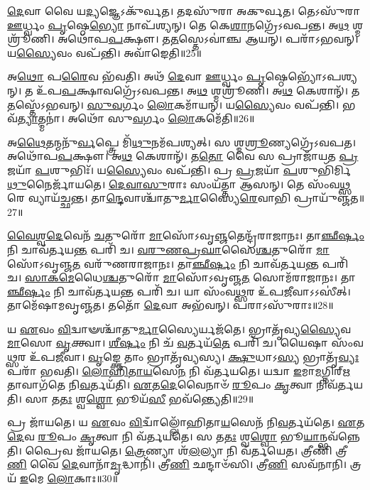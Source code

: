 \-\ul{𑌦𑍇}\-𑌵𑌾 𑌵𑍈 𑌯\-\ul{𑌦𑍍𑌯}\-𑌜𑍍𑌞𑍇\-𑌽𑌕𑍁᳴𑌰𑍍𑌵𑌤।
𑌤𑌦𑌸𑍁᳴𑌰𑌾 𑌅𑌕𑍁𑌰𑍍𑌵𑌤।
𑌤𑍇𑌽𑌸𑍁᳴𑌰𑌾 \ul{𑌊}\-𑌰𑍍𑌧𑍍𑌵𑌂 \ul{𑌪𑍃}\-𑌷𑍍𑌠𑍇\-\ul{𑌭𑍍𑌯𑍋} 𑌨𑌾𑌪᳴𑌶𑍍𑌯𑌨𑍍।
𑌤𑍇 𑌕𑍇\-\ul{𑌶𑌾}\-𑌨𑌗𑍍𑌰𑍇᳴\-𑌽𑌵𑌪𑌨𑍍𑌤।
𑌅\-\ul{𑌥} 𑌶𑍍𑌮𑌶𑍍𑌰𑍂᳴𑌣𑌿।
𑌅𑌥𑍋᳴𑌪\-\ul{𑌪}\-𑌕𑍍𑌷𑍗।
𑌤\-\ul{𑌤}\-𑌸𑍍𑌤𑍇\-𑌽𑌵𑌾॑𑌞𑍍𑌚 𑌆𑌯𑌨𑍍।
𑌪𑌰𑌾᳴𑌽𑌭𑌵𑌨𑍍।
𑌯\-\ul{𑌸𑍍𑌯𑍈}\-𑌵𑌂 𑌵𑌪᳴𑌨𑍍𑌤𑌿।
𑌅𑌵𑌾᳴𑌙𑍇𑌤𑌿॥25॥

𑌅\-\ul{𑌥𑍋} 𑌪\-\ul{𑌰𑍈}\-𑌵 𑌭᳴𑌵𑌤𑌿।
𑌅𑌥᳴ \ul{𑌦𑍇}\-𑌵𑌾 \ul{𑌊}\-𑌰𑍍𑌧𑍍𑌵𑌂 \ul{𑌪𑍃}\-𑌷𑍍𑌠𑍇𑌭𑍍𑌯𑍋᳴\-𑌽𑌪𑌶𑍍𑌯𑌨𑍍।
𑌤 𑌉᳴𑌪\-\ul{𑌪}\-𑌕𑍍𑌷𑌾𑌵𑌗𑍍𑌰𑍇᳴\-𑌽𑌵𑌪𑌨𑍍𑌤।
𑌅\-\ul{𑌥} 𑌶𑍍𑌮𑌶𑍍𑌰𑍂᳴𑌣𑌿।
𑌅\-\ul{𑌥} 𑌕𑍇𑌶𑌾𑌨𑍍᳴।
𑌤\-\ul{𑌤}\-𑌸𑍍𑌤𑍇᳴\-𑌽𑌭𑌵𑌨𑍍।
\-\ul{𑌸𑍁}\-\-\ul{𑌵}\-𑌰𑍍𑌗𑌂 \ul{𑌲𑍋}\-𑌕𑌮𑌾᳴𑌯𑌨𑍍।
𑌯\-\ul{𑌸𑍍𑌯𑍈}\-𑌵𑌂 𑌵𑌪᳴𑌨𑍍𑌤𑌿।
𑌭𑌵᳴\-\ul{𑌤𑍍𑌯𑌾}\-𑌤𑍍𑌮𑌨𑌾॑।
𑌅𑌥𑍋᳴ 𑌸𑍁\-\ul{𑌵}\-𑌰𑍍𑌗𑌂 \ul{𑌲𑍋}\-𑌕𑌮𑍇᳴𑌤𑌿॥26॥

𑌅\-\ul{𑌥𑍈}\-𑌤𑌨𑍍𑌮𑌨𑍁᳴\-\ul{𑌰𑍍𑌵}\-𑌪𑍍𑌤𑍍𑌰𑍇 𑌮𑌿᳴\-\ul{𑌥𑍁}\-𑌨𑌮᳴𑌪𑌶𑍍𑌯𑌤𑍍।
𑌸 𑌶𑍍𑌮\-\ul{𑌶𑍍𑌰𑍂}\-𑌣𑍍𑌯𑌗𑍍𑌰𑍇᳴𑌽𑌵𑌪𑌤।
𑌅𑌥𑍋᳴𑌪\-\ul{𑌪}\-𑌕𑍍𑌷𑍗।
𑌅\-\ul{𑌥} 𑌕𑍇𑌶𑌾𑌨𑍍᳴।
𑌤\-\ul{𑌤𑍋} 𑌵𑍈 𑌸 𑌪𑍍𑌰𑌾𑌜𑌾᳴𑌯𑌤 \ul{𑌪𑍍𑌰}\-𑌜𑌯𑌾᳴ \ul{𑌪}\-𑌶𑍁𑌭𑌿𑌃᳴।
𑌯\-\ul{𑌸𑍍𑌯𑍈}\-𑌵𑌂 𑌵𑌪᳴𑌨𑍍𑌤𑌿।
𑌪𑍍𑌰 \ul{𑌪𑍍𑌰}\-𑌜𑌯𑌾᳴ \ul{𑌪}\-𑌶𑍁𑌭𑌿᳴𑌰𑍍𑌮𑌿\-\ul{𑌥𑍁}\-𑌨𑍈𑌰𑍍𑌜𑌾᳴𑌯𑌤𑍇।
\-\ul{𑌦𑍇}\-\-\ul{𑌵𑌾}\-\-\ul{𑌸𑍁}\-𑌰𑌾𑌃 𑌸𑌂𑌯᳴𑌤𑍍𑌤𑌾 𑌆𑌸𑌨𑍍।
𑌤𑍇 𑌸𑌂᳴𑌵\-\ul{𑌥𑍍𑌸}\-𑌰𑍇 𑌵𑍍𑌯𑌾𑌯᳴𑌚𑍍𑌛𑌨𑍍𑌤।
𑌤𑌾\-\ul{𑌨𑍍𑌦𑍇}\-𑌵𑌾𑌶𑍍𑌚𑌾᳴𑌤𑍁\-\ul{𑌰𑍍𑌮𑌾}\-𑌸𑍍𑌯𑍈\-\ul{𑌰𑍇}\-𑌵𑌾𑌭𑌿 𑌪𑍍𑌰𑌾𑌯𑍁᳴𑌞𑍍𑌜𑌤॥27॥

\-\ul{𑌵𑍈}\-\-\ul{𑌶𑍍𑌵}\-\-\ul{𑌦𑍇}\-𑌵𑍇𑌨᳴ \ul{𑌚}\-𑌤𑍁𑌰𑍋᳴ \ul{𑌮𑌾}\-𑌸𑍋᳴\-𑌽𑌵𑍃\-\ul{𑌞𑍍𑌜}\-𑌤𑍇𑌨𑍍𑌦𑍍𑌰᳴𑌰𑌾𑌜𑌾𑌨𑌃।
𑌤𑌾\-\ul{𑌞𑍍𑌛𑍀}\-\-\ul{𑌰𑍍}\-𑌷𑌂 𑌨𑌿 𑌚𑌾𑌵᳴𑌰𑍍𑌤𑌯\-\ul{𑌨𑍍𑌤} 𑌪𑌰𑌿᳴ 𑌚।
\-\ul{𑌵}\-\-\ul{𑌰𑍁}\-\-\ul{𑌣}\-\-\ul{𑌪𑍍𑌰}\-\-\ul{𑌘𑌾}\-𑌸𑍈\-\ul{𑌶𑍍𑌚}\-𑌤𑍁𑌰𑍋᳴ \ul{𑌮𑌾}\-𑌸𑍋᳴\-𑌽𑌵𑍃𑌞𑍍𑌜\-\ul{𑌤} 𑌵𑌰𑍁᳴𑌣𑌰𑌾𑌜𑌾𑌨𑌃।
𑌤𑌾\-\ul{𑌞𑍍𑌛𑍀}\-\-\ul{𑌰𑍍}\-𑌷𑌂 𑌨𑌿 𑌚𑌾𑌵᳴𑌰𑍍𑌤𑌯\-\ul{𑌨𑍍𑌤} 𑌪𑌰𑌿᳴ 𑌚।
\-\ul{𑌸𑌾}\-\-\ul{𑌕}\-\-\ul{𑌮𑍇}\-𑌧𑍈\-\ul{𑌶𑍍𑌚}\-𑌤𑍁𑌰𑍋᳴ \ul{𑌮𑌾}\-𑌸𑍋᳴\-𑌽𑌵𑍃𑌞𑍍𑌜\-\ul{𑌤} 𑌸𑍋𑌮᳴𑌰𑌾𑌜𑌾𑌨𑌃।
𑌤𑌾\-\ul{𑌞𑍍𑌛𑍀}\-\-\ul{𑌰𑍍}\-𑌷𑌂 𑌨𑌿 𑌚𑌾𑌵᳴𑌰𑍍𑌤𑌯\-\ul{𑌨𑍍𑌤} 𑌪𑌰𑌿᳴ 𑌚।
𑌯𑌾 𑌸𑌂᳴𑌵\-\ul{𑌥𑍍𑌸}\-𑌰 𑌉᳴𑌪\-\ul{𑌜𑍀}\-𑌵𑌾\-𑌽𑌽𑌸𑍀॑𑌤𑍍।
𑌤𑌾𑌮𑍇᳴𑌷𑌾𑌮𑌵𑍃𑌞𑍍𑌜𑌤।
𑌤𑌤𑍋᳴ \ul{𑌦𑍇}\-𑌵𑌾 𑌅𑌭᳴𑌵𑌨𑍍।
𑌪𑌰𑌾𑌽𑌸𑍁᳴𑌰𑌾𑌃॥28॥

𑌯 \ul{𑌏}\-𑌵𑌂 \ul{𑌵𑌿}\-𑌦𑍍𑌵𑌾𑍟𑌶𑍍𑌚𑌾᳴𑌤𑍁\-\ul{𑌰𑍍𑌮𑌾}\-𑌸𑍍𑌯𑍈𑌰𑍍𑌯𑌜᳴𑌤𑍇।
𑌭𑍍𑌰𑌾𑌤𑍃᳴𑌵𑍍𑌯\-\ul{𑌸𑍍𑌯𑍈}\-𑌵 \ul{𑌮𑌾}\-𑌸𑍋 \ul{𑌵𑍃}\-𑌕𑍍𑌤𑍍𑌵𑌾।
\-\ul{𑌶𑍀}\-\-\ul{𑌰𑍍}\-𑌷𑌂 𑌨𑌿 𑌚᳴ \ul{𑌵}\-𑌰𑍍𑌤𑌯᳴\-\ul{𑌤𑍇} 𑌪𑌰𑌿᳴ 𑌚।
𑌯𑍈𑌷𑌾 𑌸𑌂᳴𑌵\-\ul{𑌥𑍍𑌸}\-𑌰 𑌉᳴𑌪\-\ul{𑌜𑍀}\-𑌵𑌾।
\-\ul{𑌵𑍃}\-𑌙𑍍𑌕𑍍𑌤𑍇 𑌤𑌾𑌂 𑌭𑍍𑌰𑌾𑌤𑍃᳴𑌵𑍍𑌯𑌸𑍍𑌯।
\-\ul{𑌕𑍍𑌷𑍁}\-𑌧𑌾\-𑌽\-\ul{𑌸𑍍𑌯} 𑌭𑍍𑌰𑌾𑌤𑍃᳴\-\ul{𑌵𑍍𑌯𑌃} 𑌪𑌰𑌾᳴ 𑌭𑌵𑌤𑌿।
\-\ul{𑌲𑍋}\-\-\ul{𑌹𑌿}\-\-\ul{𑌤𑌾}\-\-\ul{𑌯}\-𑌸𑍇\-\ul{𑌨} 𑌨𑌿 𑌵᳴𑌰𑍍𑌤𑌯𑌤𑍇।
𑌯𑌦𑍍𑌵𑌾 \ul{𑌇}\-𑌮𑌾\-\ul{𑌮}\-𑌗𑍍𑌨𑌿𑌰𑍍\mbox{}\-\ul{𑌋}\-𑌤𑌾𑌵𑌾𑌗᳴𑌤𑍇 𑌨𑌿\-\ul{𑌵}\-𑌰𑍍𑌤𑌯᳴𑌤𑌿।
\-\ul{𑌏}\-𑌤\-\ul{𑌦𑍇}\-𑌵𑍈𑌨𑌾𑍞᳴ \ul{𑌰𑍂}\-𑌪𑌂 \ul{𑌕𑍃}\-𑌤𑍍𑌵𑌾 𑌨𑌿𑌵᳴𑌰𑍍𑌤𑌯𑌤𑌿।
𑌸𑌾 𑌤\-\ul{𑌤𑌃} 𑌶𑍍𑌵\-\ul{𑌶𑍍𑌵𑍋} 𑌭𑍂𑌯᳴\-\ul{𑌸𑍀} 𑌭𑌵᳴𑌨𑍍𑌤𑍍𑌯𑍇𑌤𑌿॥29॥

𑌪𑍍𑌰 𑌜𑌾᳴𑌯𑌤𑍇।
𑌯 \ul{𑌏}\-𑌵𑌂 \ul{𑌵𑌿}\-𑌦𑍍𑌵𑌾𑌁𑌲𑍍𑌲𑍋᳴𑌹𑌿𑌤𑌾\-\ul{𑌯}\-𑌸𑍇𑌨᳴ 𑌨𑌿\-\ul{𑌵}\-𑌰𑍍𑌤𑌯᳴𑌤𑍇।
\-\ul{𑌏}\-𑌤\-\ul{𑌦𑍇}\-𑌵 \ul{𑌰𑍂}\-𑌪𑌂 \ul{𑌕𑍃}\-𑌤𑍍𑌵𑌾 𑌨𑌿 𑌵᳴𑌰𑍍𑌤𑌯𑌤𑍇।
𑌸 𑌤\-\ul{𑌤𑌃} 𑌶𑍍𑌵\-\ul{𑌶𑍍𑌵𑍋} 𑌭𑍂\-\ul{𑌯𑌾}\-𑌨𑍍𑌭𑌵᳴𑌨𑍍𑌨𑍇𑌤𑌿।
𑌪𑍍𑌰𑍈𑌵 𑌜𑌾᳴𑌯𑌤𑍇।
\-\ul{𑌤𑍍𑌰𑍇}\-𑌣𑍍𑌯𑌾 𑌶᳴\-\ul{𑌲}\-𑌲𑍍𑌯𑌾 𑌨𑌿 𑌵᳴𑌰𑍍𑌤𑌯𑍇𑌤।
𑌤𑍍𑌰𑍀𑌣𑌿᳴ 𑌤𑍍𑌰𑍀\-\ul{𑌣𑌿} 𑌵𑍈 \ul{𑌦𑍇}\-𑌵𑌾𑌨𑌾᳴\-\ul{𑌮𑍃}\-𑌦𑍍𑌧𑌾𑌨𑌿᳴।
𑌤𑍍𑌰𑍀\-\ul{𑌣𑌿} 𑌛𑌨𑍍𑌦𑌾𑍞᳴𑌸𑌿।
𑌤𑍍𑌰𑍀\-\ul{𑌣𑌿} 𑌸𑌵᳴𑌨𑌾𑌨𑌿।
𑌤𑍍𑌰𑌯᳴ \ul{𑌇}\-𑌮𑍇 \ul{𑌲𑍋}\-𑌕𑌾𑌃॥30॥

